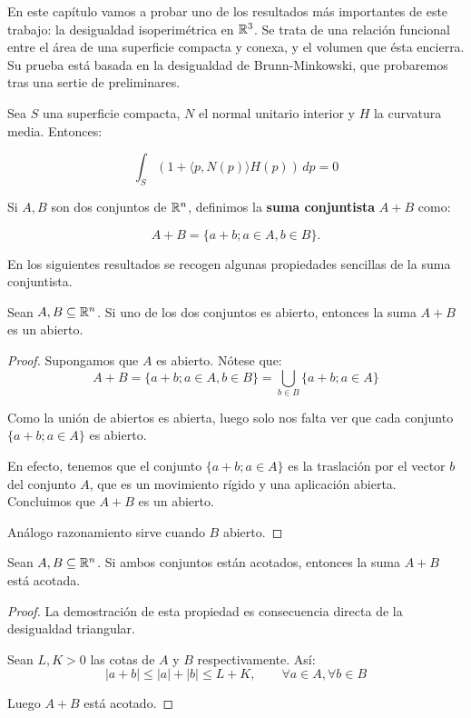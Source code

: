 En este capítulo vamos a probar uno de los resultados más importantes de este trabajo: la desigualdad isoperimétrica en $\mathbb{R}^3$. Se trata de una relación funcional entre el área de una superficie compacta y conexa, y el volumen que ésta encierra. Su prueba está basada en la desigualdad de Brunn-Minkowski, que probaremos tras una sertie de preliminares.

\begin{theorem}\label{formulaminkowski}
Sea $S$ una superficie compacta, $N$ el normal unitario interior y $H$ la curvatura media. Entonces:

\begin{equation*}
    \int_S (1+ \langle p, N(p) \rangle H(p)) \, dp = 0
\end{equation*}
\end{theorem}

\begin{definition}
Si $A, B$ son dos conjuntos de $\mathbb{R}^n$, definimos la \textbf{suma conjuntista} $A+B$ como:

\begin{equation*}
    A+B = \{a+b; a \in A, b \in B\}.
\end{equation*}
\end{definition}

En los siguientes resultados se recogen algunas propiedades sencillas de la suma conjuntista.

\begin{lemma}
Sean $A,B \subseteq \mathbb{R}^n$. Si uno de los dos conjuntos es abierto, entonces la suma $A+B$ es un abierto.
\end{lemma}
\begin{proof}
Supongamos que $A$ es abierto. Nótese que:
\begin{equation*}
    A + B = \{a+b; a \in A, b \in B\} = \bigcup_{b \in B} \{a+b; a \in A\}
\end{equation*}

Como la unión de abiertos es abierta, luego solo nos falta ver que cada conjunto $\{a+b; a \in A\}$ es abierto.

En efecto, tenemos que el conjunto $\{a+b; a \in A\}$ es la traslación por el vector $b$ del conjunto $A$, que es un movimiento rígido y una aplicación abierta. Concluimos que $A+B$ es un abierto.

Análogo razonamiento sirve cuando $B$ abierto.
\end{proof}


\begin{lemma}
Sean $A,B \subseteq \mathbb{R}^n$. Si ambos conjuntos están acotados, entonces la suma $A+B$ está acotada.
\end{lemma}
\begin{proof}
La demostración de esta propiedad es consecuencia directa de la desigualdad triangular.

Sean $L,K > 0$ las cotas de $A$ y $B$ respectivamente. Así:
\begin{equation*}
    |a+b| \leq |a|+|b| \leq L + K, \qquad \forall a \in A, \forall b\in B
\end{equation*}

Luego $A+B$ está acotado.
\end{proof}

